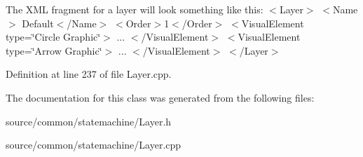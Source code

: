 The X\-M\-L fragment for a layer will look something like this\-: $<$\-Layer$>$ $<$\-Name$>$ Default$<$/\-Name$>$ $<$\-Order$>$1$<$/\-Order$>$ $<$\-Visual\-Element type=\char`\"{}\-Circle Graphic\char`\"{}$>$ ... $<$/\-Visual\-Element$>$ $<$\-Visual\-Element type=\char`\"{}\-Arrow Graphic\char`\"{}$>$ ... $<$/\-Visual\-Element$>$ $<$/\-Layer$>$ 

Definition at line 237 of file Layer.\-cpp.



The documentation for this class was generated from the following files\-:\begin{DoxyCompactItemize}
\item 
source/common/statemachine/Layer.\-h\item 
source/common/statemachine/Layer.\-cpp\end{DoxyCompactItemize}
